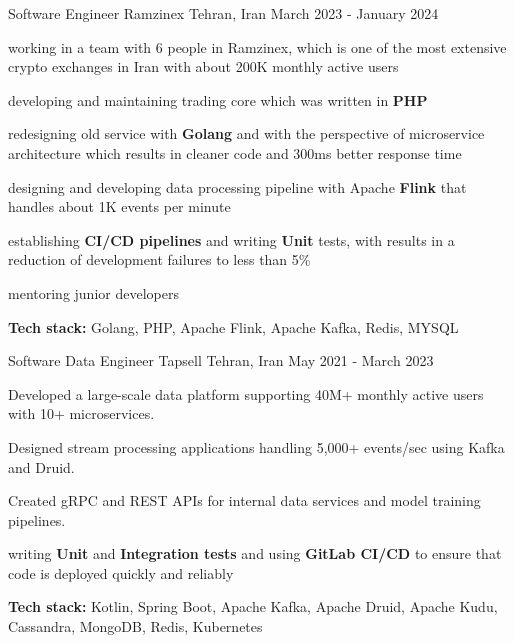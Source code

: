 \begin{cventries}
    
  \cventry
    {Software Engineer} %
    {Ramzinex} %
    {Tehran, Iran} %
    {March 2023 - January 2024} %
    {
      \begin{cvitems} %
        \item working in a team with 6 people in Ramzinex, which is one of the most extensive crypto exchanges in Iran with about 200K monthly active users
        \item developing and maintaining trading core which was written in \textbf{PHP}
        \item redesigning old service with \textbf{Golang} and with the perspective of microservice architecture which results in cleaner code and 300ms better response time
        \item designing and developing data processing pipeline with Apache \textbf{Flink} that handles about 1K events per minute
        \item establishing \textbf{CI/CD pipelines} and writing \textbf{Unit} tests, with results in a reduction of development failures to less than 5\%
        \item mentoring junior developers
        \item \textbf{Tech stack:} Golang, PHP, Apache Flink, Apache Kafka, Redis, MYSQL
      \end{cvitems}
    }

    \cventry
    {Software Data Engineer} %
    {Tapsell} %
    {Tehran, Iran} %
    {May 2021 - March 2023} %
    {
      \begin{cvitems} %
        \item Developed a large-scale data platform supporting 40M+ monthly active users with 10+ microservices.
        \item Designed stream processing applications handling 5,000+ events/sec using Kafka and Druid.
        \item Created gRPC and REST APIs for internal data services and model training pipelines.
        \item writing \textbf{Unit} and \textbf{Integration tests} and using \textbf{GitLab CI/CD} to ensure that code is deployed quickly and reliably
        \item \textbf{Tech stack:} Kotlin, Spring Boot, Apache Kafka, Apache Druid, Apache Kudu, Cassandra, MongoDB, Redis, Kubernetes
      \end{cvitems}
    }


\end{cventries}
